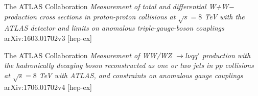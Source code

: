 \documentclass[11pt,oneside,a4paper]{article}
\begin{document}
\begin{thebibliography}{9}
The ATLAS Collaboration
\textit{Measurement of total and differential W+W− production cross sections in proton-proton collisions at $\sqrt{s} = 8$ TeV with the ATLAS detector and limits on anomalous triple-gauge-boson couplings}
arXiv:1603.01702v3 [hep-ex]

The ATLAS Collaboration
\textit{Measurement of WW/WZ $\rightarrow l\nu qq'$ production with the hadronically decaying boson reconstructed as one or two jets in pp collisions at $\sqrt{s} = 8$ TeV with ATLAS, and constraints on anomalous gauge couplings}
arXiv:1706.01702v4 [hep-ex]


\end{thebibliography}
\end{document}
